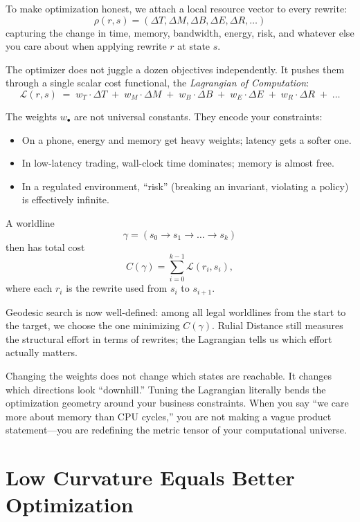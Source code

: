 To make optimization honest, we attach a local resource vector to every rewrite:
\[
\rho(r, s) = (\Delta T, \Delta M, \Delta B, \Delta E, \Delta R, \dots)
\]
capturing the change in time, memory, bandwidth, energy, risk, and whatever else you care about when applying rewrite $r$ at state $s$.

The optimizer does not juggle a dozen objectives independently. It pushes them through a single scalar cost functional, the \emph{Lagrangian of Computation}:
\[
\mathcal{L}(r, s) \;=\; w_T \cdot \Delta T
  \;+\; w_M \cdot \Delta M
  \;+\; w_B \cdot \Delta B
  \;+\; w_E \cdot \Delta E
  \;+\; w_R \cdot \Delta R
  \;+\; \dots
\]

The weights $w_\bullet$ are not universal constants. They encode your constraints:

\begin{itemize}
  \item On a phone, energy and memory get heavy weights; latency gets a softer one.
  \item In low-latency trading, wall-clock time dominates; memory is almost free.
  \item In a regulated environment, ``risk'' (breaking an invariant, violating a policy) is effectively infinite.
\end{itemize}

A worldline
\[
\gamma = (s_0 \to s_1 \to \dots \to s_k)
\]
then has total cost
\[
C(\gamma) = \sum_{i=0}^{k-1} \mathcal{L}(r_i, s_i),
\]
where each $r_i$ is the rewrite used from $s_i$ to $s_{i+1}$.

Geodesic search is now well-defined: among all legal worldlines from the start to the target, we choose the one minimizing $C(\gamma)$. Rulial Distance still measures the structural effort in terms of rewrites; the Lagrangian tells us which effort actually matters.

Changing the weights does not change which states are reachable. It changes which directions look ``downhill.'' Tuning the Lagrangian literally bends the optimization geometry around your business constraints. When you say ``we care more about memory than CPU cycles,'' you are not making a vague product statement—you are redefining the metric tensor of your computational universe.

\section{Low Curvature Equals Better Optimization}
\label{low-curvature-better-optimization}

